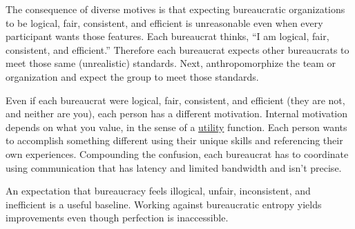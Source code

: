 The consequence of diverse motives is that expecting bureaucratic organizations to be logical, fair, consistent, and efficient is unreasonable even when every participant wants those features. Each bureaucrat thinks, ``I am logical, fair, consistent, and efficient.'' Therefore each bureaucrat expects other bureaucrats to meet those same (unrealistic) standards. Next, anthropomorphize the team or organization and expect the group to meet those standards. 

Even if each bureaucrat were logical, fair, consistent, and efficient (they are not, and neither are you), each person has a different motivation. Internal motivation depends on what you value, in the sense of a
\href{https://en.wikipedia.org/wiki/Utility}{utility} function.  Each person wants to accomplish something different using their unique skills and referencing their own experiences. Compounding the confusion, each bureaucrat has to coordinate using communication that has latency and limited bandwidth and isn't precise.

An expectation that bureaucracy feels illogical, unfair, inconsistent, and inefficient is a useful baseline. Working against bureaucratic entropy yields improvements even though perfection is inaccessible.